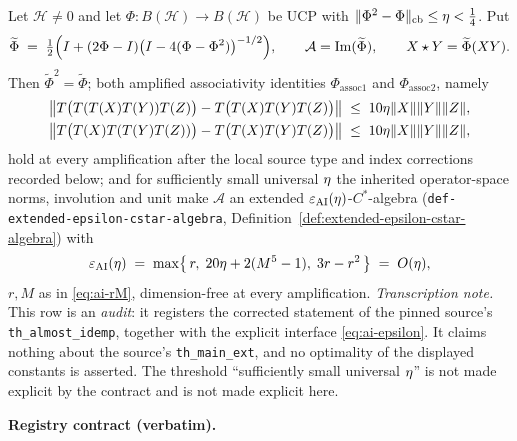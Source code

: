 \begin{lemma}\label{lem:kitaev-almost-idemp-audit}
Let $\mathcal H\ne0$ and let $\Phi:B(\mathcal H)\to B(\mathcal H)$ be UCP with
$\lVert \Phi^{2}-\Phi\rVert_{\mathrm{cb}}\le\eta<\tfrac14$. Put
\begin{equation}\label{eq:ai-projector}
  \widetilde\Phi\;=\;\tfrac12\Bigl(I+(2\Phi-I)\bigl(I-4(\Phi-\Phi^{2})\bigr)^{-1/2}\Bigr),
  \qquad
  \mathcal A=\operatorname{Im}(\widetilde\Phi),
  \qquad
  X\star Y=\widetilde\Phi(XY).
\end{equation}
Then $\widetilde\Phi^{2}=\widetilde\Phi$; both amplified associativity identities
$\Phi_{\mathrm{assoc}1}$ and $\Phi_{\mathrm{assoc}2}$, namely
\begin{align}\label{eq:ai-assoc}
  \bigl\lVert T\bigl(T(T(X)T(Y))T(Z)\bigr)-T\bigl(T(X)T(Y)T(Z)\bigr)\bigr\rVert
  &\;\le\;10\eta\lVert X\rVert\lVert Y\rVert\lVert Z\rVert,\\
  \bigl\lVert T\bigl(T(X)T(T(Y)T(Z))\bigr)-T\bigl(T(X)T(Y)T(Z)\bigr)\bigr\rVert
  &\;\le\;10\eta\lVert X\rVert\lVert Y\rVert\lVert Z\rVert,\notag
\end{align}
hold at every amplification after the local source type and index corrections recorded
below; and for sufficiently small universal $\eta$ the inherited operator-space norms,
involution and unit make $\mathcal A$ an extended $\varepsilon_{\mathrm{AI}}(\eta)$-$C^{*}$-algebra
(\texttt{def-extended-epsilon-cstar-algebra}, Definition~\ref{def:extended-epsilon-cstar-algebra})
with
\begin{equation}\label{eq:ai-epsilon}
  \varepsilon_{\mathrm{AI}}(\eta)\;=\;\max\bigl\{\,r,\;20\eta+2(M^{5}-1),\;3r-r^{2}\,\bigr\}
  \;=\;O(\eta),
\end{equation}
$r,M$ as in \eqref{eq:ai-rM}, dimension-free at every amplification.
\emph{Transcription note.} This row is an \emph{audit}: it registers the corrected
statement of the pinned source's \texttt{th\_almost\_idemp}, together with the explicit
interface \eqref{eq:ai-epsilon}. It claims nothing about the source's
\texttt{th\_main\_ext}, and no optimality of the displayed constants is asserted. The
threshold ``sufficiently small universal $\eta$'' is not made explicit by the contract
and is not made explicit here.
\end{lemma}

\noindent\textbf{Registry contract (verbatim).}

